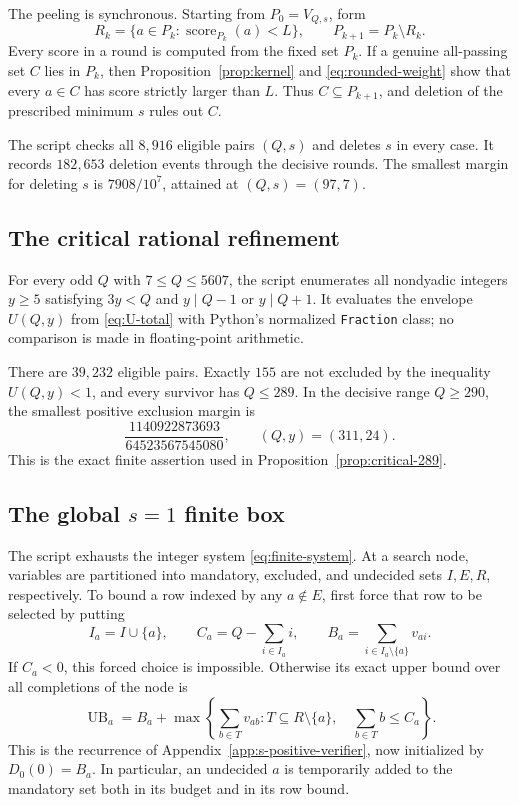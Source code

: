 \documentclass[11pt]{article}
\theoremstyle{definition}
\theoremstyle{remark}
\begin{document}
The peeling is synchronous.  Starting from \(P_0=V_{Q,s}\), form
\[
 R_k=\{a\in P_k:\operatorname{score}_{P_k}(a)<L\},
 \qquad P_{k+1}=P_k\setminus R_k.
\]
Every score in a round is computed from the fixed set \(P_k\).  If a
genuine all-passing set \(C\) lies in \(P_k\), then
Proposition~\ref{prop:kernel} and \eqref{eq:rounded-weight} show that every
\(a\in C\) has score strictly larger than \(L\).  Thus \(C\subseteq
P_{k+1}\), and deletion of the prescribed minimum \(s\) rules out \(C\).

The script  checks all \(8{,}916\)
eligible pairs \((Q,s)\) and deletes \(s\) in every case.  It records
\(182{,}653\) deletion events through the decisive rounds.  The smallest
margin for deleting \(s\) is \(7908/10^7\), attained at
\((Q,s)=(97,7)\).

\subsection{The critical rational refinement}
\label{app:critical-verifier}

For every odd \(Q\) with \(7\le Q\le5607\), the script
 enumerates all nondyadic integers
\(y\ge5\) satisfying \(3y<Q\) and \(y\mid Q-1\) or \(y\mid Q+1\).
It evaluates the envelope \(U(Q,y)\) from \eqref{eq:U-total} with Python's
normalized \texttt{Fraction} class; no comparison is made in floating-point
arithmetic.

There are \(39{,}232\) eligible pairs.  Exactly \(155\) are not excluded
by the inequality \(U(Q,y)<1\), and every survivor has \(Q\le289\).  In the
decisive range \(Q\ge290\), the smallest positive exclusion margin is
\[
 \frac{1140922873693}{64523567545080},
 \qquad (Q,y)=(311,24).
\]
This is the exact finite assertion used in
Proposition~\ref{prop:critical-289}.

\subsection{The global \texorpdfstring{\(s=1\)}{s = 1} finite box}
\label{app:global-verifier}

The script  exhausts the integer system
\eqref{eq:finite-system}.  At a search node, variables are partitioned into
mandatory, excluded, and undecided sets \(I,E,R\), respectively.  To bound
a row indexed by any \(a\notin E\), first force that row to be selected by
putting
\[
 I_a=I\cup\{a\},\qquad
 C_a=Q-\sum_{i\in I_a}i,\qquad
 B_a=\sum_{i\in I_a\setminus\{a\}}v_{ai}.
\]
If \(C_a<0\), this forced choice is impossible.  Otherwise its exact upper
bound over all completions of the node is
\[
 \operatorname{UB}_a=
 B_a+\max\left\{
   \sum_{b\in T}v_{ab}:
   T\subseteq R\setminus\{a\},\quad
   \sum_{b\in T}b\le C_a
 \right\}.
\]
This is the recurrence of Appendix~\ref{app:s-positive-verifier}, now
initialized by \(D_0(0)=B_a\).  In particular, an undecided \(a\) is
temporarily added to the mandatory set both in its budget and in its row
bound.
\end{document}
